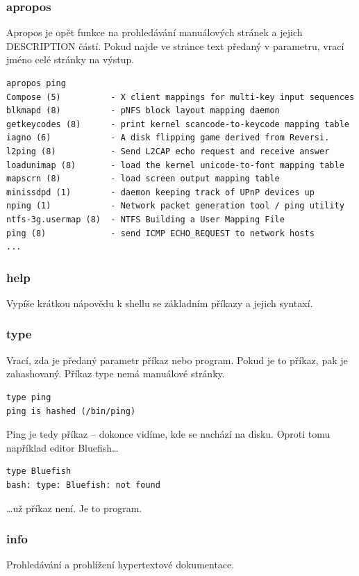\documentclass{article}
\begin{document}
\subsubsection{apropos}
Apropos je opět funkce na prohledávání manuálových stránek a jejich DESCRIPTION částí. Pokud najde ve stránce text předaný v parametru, vrací jméno celé stránky na výstup.
\begin{verbatim}
apropos ping
Compose (5)          - X client mappings for multi-key input sequences
blkmapd (8)          - pNFS block layout mapping daemon
getkeycodes (8)      - print kernel scancode-to-keycode mapping table
iagno (6)            - A disk flipping game derived from Reversi.
l2ping (8)           - Send L2CAP echo request and receive answer
loadunimap (8)       - load the kernel unicode-to-font mapping table
mapscrn (8)          - load screen output mapping table
minissdpd (1)        - daemon keeping track of UPnP devices up
nping (1)            - Network packet generation tool / ping utility
ntfs-3g.usermap (8)  - NTFS Building a User Mapping File
ping (8)             - send ICMP ECHO_REQUEST to network hosts
...
\end{verbatim}

\subsubsection{help}
Vypíše krátkou nápovědu k shellu se základním příkazy a jejich syntaxí.

\subsubsection{type}
Vrací, zda je předaný parametr příkaz nebo program. Pokud je to příkaz, pak je zahashovaný. Příkaz type nemá manuálové stránky.
\begin{verbatim}
type ping
ping is hashed (/bin/ping)
\end{verbatim}
Ping je tedy příkaz -- dokonce vidíme, kde se nachází na disku. Oproti tomu například editor Bluefish\dots
\begin{verbatim}
type Bluefish
bash: type: Bluefish: not found
\end{verbatim}
\dots už příkaz není. Je to program.

\subsubsection{info}	
Prohledávání a prohlížení hypertextové dokumentace.
\end{document}
